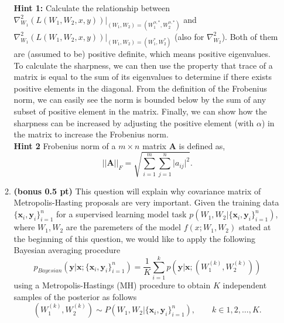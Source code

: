 \begin{enumerate}
\begin{enumerate}
    
    \textbf{Hint 1:} Calculate the relationship between $\nabla^2_{W_1}(L(W_1,W_2,x,y))|_{(W_1,W_2) = (W^{\alpha,*}_1,W^{\alpha,*}_2)}$ and\\ $\nabla^2_{W_1}(L(W_1,W_2,x,y))|_{(W_1,W_2) = (W^{*}_1,W^{*}_2)}$ (also for $\nabla^2_{W_2}$). Both of them are (assumed to be) positive definite, which means positive eigenvalues. To calculate the sharpness, we can then use the property that trace of a matrix is equal to the sum of its eigenvalues to determine if there exists positive elements in the diagonal. From the definition of the Frobenius norm, we can easily see the norm is bounded below by the sum of any subset of positive element in the matrix. Finally, we can show how the sharpness can be increased by adjusting the positive element (with $\alpha$) in the matrix to increase the Frobenius norm. \\
    \textbf{Hint 2}
    {Frobenius norm of a $m \times n$ matrix $\mathbf{A}$ is defined as, 
        \begin{displaymath}
           \lvert\lvert\mathbf{A}\rvert\rvert_{F} = \sqrt{\sum_{i=1}^{m}\sum_{j=1}^{n}\lvert a_{ij}\rvert^2} .
        \end{displaymath}
        }

    \vspace{3in}
    

    \newpage
    \item {\bf (bonus 0.5 pt)} This question will explain why covariance matrix of Metropolis-Hasting proposals are very important. Given the training data $\{\mathbf{x}_i, \mathbf{y}_i\}_{i=1}^{n}$ for a supervised learning model task $p(W_1, W_2| \{\mathbf{x}_i, \mathbf{y}_i\}_{i=1}^{n})$, where $W_1, W_2$ are the paremeters of the model $f(x;W_1,W_2)$ stated at the beginning of this question,  we would like to apply the following Bayesian averaging procedure $$p_{Bayesian}(\mathbf{y}|\mathbf{x}; \{\mathbf{x}_i, \mathbf{y}_i\}_{i=1}^{n}) = \frac{1}{K}\sum_{i=1}^{k}p(\mathbf{y}|\mathbf{x};(W^{(k)}_1,W^{(k)}_2))$$ using a Metropolis-Hastings (MH) procedure to obtain $K$ independent samples of the posterior as follows
    $$(W^{(k)}_1, W^{(k)}_2) \sim P(W_1, W_2 | \{\mathbf{x}_i, \mathbf{y}_i\}_{i=1}^{n} ), \qquad k \in{1, 2, \ldots, K}.$$ 
    

\end{enumerate}
\end{enumerate}
